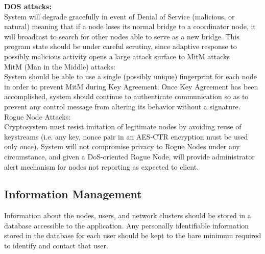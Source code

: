 \documentclass[tikz,a4paper,titlepage]{article}
\begin{document}

{\bfseries{DOS attacks:}}\\
System will degrade gracefully in event of Denial of Service (malicious, or natural) meaning that if a node loses its normal bridge to a coordinator node, it will broadcast to search for other nodes able to serve as a new bridge. This program state should be under careful scrutiny, since adaptive response to possibly malicious activity opens a large attack surface to MitM attacks \\%

MitM (Man in the Middle) attacks:\\
System should be able to use a single (possibly unique) fingerprint for each node in order to prevent MitM during Key Agreement. Once Key Agreement has been accomplished, system should continue to authenticate communication so as to prevent any control message from altering its behavior without a signature.\\


Rogue Node Attacks:\\
Cryptosystem must resist imitation of legitimate nodes by avoiding reuse of keystreams (i.e. any key, nonce pair in an AES-CTR encryption must be used only once). System will not compromise privacy to Rogue Nodes under any circumstance, and given a DoS-oriented Rogue Node, will provide administrator alert mechanism for nodes not reporting as expected to client.\\
    
\subsection{Information Management} %

Information about the nodes, users, and network clusters should be stored in a database accessible to the application. Any personally identifiable information stored in the database for each user should be kept to the bare minimum required to identify and contact that user. 
\end{document}
